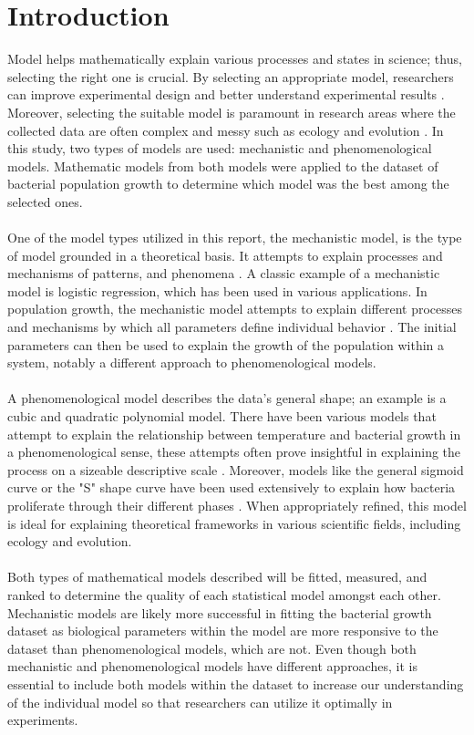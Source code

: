 \documentclass[11pt]{article}
\begin{document}
  \section{Introduction}
  \noindent  Model helps mathematically explain various processes and states in science; thus, selecting the right one is crucial.
  By selecting an appropriate model, researchers can improve experimental design and better understand experimental results \cite{motulsky2004fitting}.
  Moreover, selecting the suitable model is paramount in research areas where the collected data are often complex and messy such as ecology and evolution \cite{johnson2004model}.
  In this study, two types of models are used: mechanistic and phenomenological models.
  Mathematic models from both models were applied to the dataset of bacterial population growth to determine which model was the best among the selected ones.
  \\
  \\
  One of the model types utilized in this report, the mechanistic model, is the type of model grounded in a theoretical basis.
  It attempts to explain processes and mechanisms of patterns, and phenomena \cite{mhasoba_multilingual_2022}.
  A classic example of a mechanistic model is logistic regression, which has been used in various applications.
  In population growth, the mechanistic model attempts to explain different processes and mechanisms by which all parameters define individual behavior \cite{stefan2012mathematical}.
  The initial parameters can then be used to explain the growth of the population within a system, notably a different approach to phenomenological models.
  \\
  \\
  A phenomenological model describes the data's general shape; an example is a cubic and quadratic polynomial model.
  There have been various models that attempt to explain the relationship between temperature and bacterial growth in a phenomenological sense,
  these attempts often prove insightful in explaining the process on a sizeable descriptive scale \cite{heitzer1991utility}.
  Moreover, models like the general sigmoid curve or the "S" shape curve have been used extensively to explain how bacteria proliferate through their different phases \cite{longhi2017microbial}. 
  When appropriately refined, this model is ideal for explaining theoretical frameworks in various scientific fields, including ecology and evolution.
  \\
  \\
  Both types of mathematical models described will be fitted, measured, and ranked to determine the quality of each statistical model amongst each other.
  Mechanistic models are likely more successful in fitting the bacterial growth dataset as biological parameters within the model are more responsive to the dataset than phenomenological models, which are not.
  Even though both mechanistic and phenomenological models have different approaches, it is essential to include both models within the dataset to increase our understanding of the individual model so that researchers can utilize it optimally in experiments.
  
\end{document}
